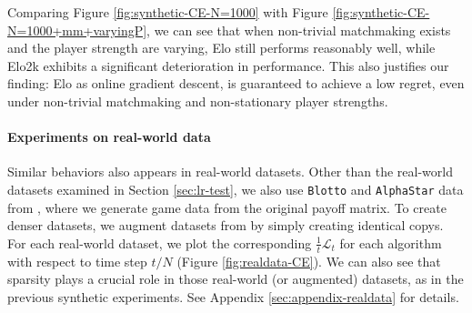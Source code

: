 
Comparing Figure \ref{fig:synthetic-CE-N=1000} with Figure \ref{fig:synthetic-CE-N=1000+mm+varyingP}, we can see that when non-trivial matchmaking exists and the player strength are varying, Elo still performs reasonably well, while Elo2k exhibits a significant deterioration in performance. This also justifies our finding: Elo as online gradient descent, is guaranteed to achieve a low regret, even under non-trivial matchmaking and non-stationary player strengths.  

\paragraph{Experiments on real-world data}
Similar behaviors also appears in real-world datasets. Other than the real-world datasets examined in Section \ref{sec:lr-test}, we also use \texttt{Blotto}  and \texttt{AlphaStar} data from \cite{czarnecki2020real}, where we generate game data from the original payoff matrix. To create denser datasets, we augment datasets from \cite{czarnecki2020real} by simply creating identical copys. For each real-world dataset, we plot the corresponding $\frac1t \mathcal{L}_t$ for each algorithm with respect to time step $t/N$ (Figure \ref{fig:realdata-CE}). We can also see that sparsity plays a crucial role in those real-world (or augmented) datasets, as in the previous synthetic experiments. See Appendix \ref{sec:appendix-realdata} for details.


